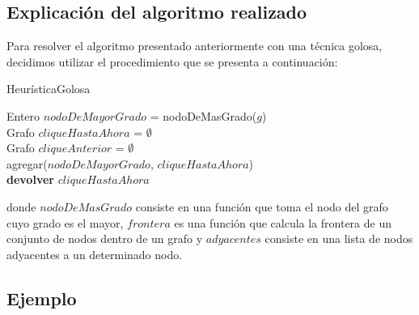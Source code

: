 \subsection{Explicación del algoritmo realizado}
Para resolver el algoritmo presentado anteriormente con una técnica golosa, decidimos utilizar el procedimiento que se presenta a continuación:\newline
\newline
\begin{algorithm}[H]
    \SetAlgoLined
    \caption{HeurísticaGolosa}
	Entero $nodoDeMayorGrado$ = nodoDeMasGrado($g$)\\
	Grafo $cliqueHastaAhora$ = $\emptyset$\\
	Grafo $cliqueAnterior$ = $\emptyset$\\
	agregar($nodoDeMayorGrado$, $cliqueHastaAhora$)\\
\textbf{devolver} $cliqueHastaAhora$
\end{algorithm}

donde $nodoDeMasGrado$ consiste en una función que toma el nodo del grafo cuyo grado es el mayor, $frontera$ es una función que calcula la frontera de un conjunto de nodos dentro de un grafo y $adyacentes$ consiste en una lista de nodos adyacentes a un determinado nodo.\newline

\subsection{Ejemplo}


